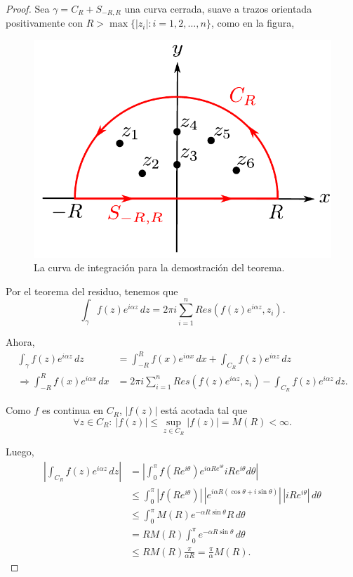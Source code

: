 \begin{proof}
Sea $\gamma = C_R + S_{-R,R}$ una curva cerrada, suave a trazos orientada positivamente con $R > \max\{|z_i| : i = 1,2, \dots, n\}$, como en la figura,

\begin{figure}[H]
    \centering
    \includegraphics[scale = 0.6]{Figuras/IntegralImpropia2.pdf}
    \caption{La curva de integración para la demostración del teorema.}
    \label{fig:IntegralImpropia6}
\end{figure}

Por el teorema del residuo, tenemos que
$$\int_{\gamma} f(z) e^{i\alpha z}\,dz = 2\pi i \sum_{i=1}^n Res(f(z) e^{i\alpha z},z_i).$$

Ahora, 
\begin{align*}
    \int_{\gamma} f(z) e^{i\alpha z} \,dz &= \int_{-R}^R f(x) e^{i\alpha x} \,dx + \int_{C_R} f(z)  e^{i\alpha z} \,dz \\
    \Rightarrow \int_{-R}^R f(x) e^{i\alpha x}\,dx &=  2\pi i \sum_{i=1}^n Res(f(z) e^{i\alpha z},z_i) - \int_{C_R} f(z)  e^{i\alpha z} \,dz.
\end{align*}

Como $f$ es continua en $C_R$, $|f(z)|$ está acotada tal que
$$\forall z \in C_R: ~ |f(z)| \leq \sup_{z \in C_R} |f(z)| = M(R) < \infty.$$

Luego,
\begin{align*}
 \left| \int_{C_R} f(z) e^{i\alpha z} \,dz \right| &=  \left| \int_0^{\pi} f(R e^{i\theta}) e^{i \alpha R e^{i\theta}} i Re^{i\theta}d\theta \right| \\
 &\leq \int_0^{\pi}|f(R e^{i\theta})| \, \left|e^{i \alpha R (\cos \theta + i \sin \theta)} \right| \,|i Re^{i\theta}|\,d\theta \\
 &\leq \int_0^{\pi} M(R) e^{-\alpha R\sin\theta} R \,d\theta \\
 &= R M(R) \int_0^{\pi} e^{-\alpha R\sin\theta} \,d\theta \\
 &\leq R M(R) \frac{\pi}{\alpha R} = \frac{\pi}{\alpha} M(R).
\end{align*}


\end{proof}
